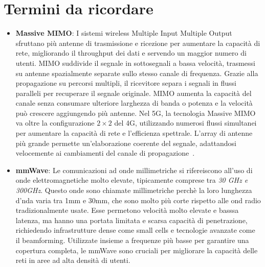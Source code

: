 \documentclass[english]{article}
\begin{document}
\section{Termini da ricordare}
\begin{itemize}
	\item \textbf{\hypertarget{MIMO}{Massive MIMO}}: I sistemi wireless Multiple Input Multiple Output
	      sfruttano più antenne di trasmissione e ricezione per aumentare la capacità di rete,
	      migliorando il throughput dei dati e servendo un maggior numero di utenti. MIMO suddivide
	      il segnale in sottosegnali a bassa velocità, trasmessi su antenne spazialmente separate
	      sullo stesso canale di frequenza. Grazie alla propagazione su percorsi multipli, il
	      ricevitore separa i segnali in flussi paralleli per recuperare il segnale originale.
	      MIMO aumenta la capacità del canale senza consumare ulteriore larghezza di banda o
	      potenza e la velocità può crescere aggiungendo più antenne. Nel 5G, la tecnologia
	      Massive MIMO va oltre la configurazione $2 \times 2$ del 4G, utilizzando numerosi
	      flussi simultanei per aumentare la capacità di rete e l'efficienza spettrale.
	      L'array di antenne più grande permette un'elaborazione coerente del segnale, adattandosi
	      velocemente ai cambiamenti del canale di propagazione~\cite{Kathavate2021Critical}.

	\item \textbf{\hypertarget{mmWave}{mmWave}}: Le comunicazioni ad onde millimetriche
	      si rifereiscono all'uso di onde elettromagnetiche molto elevate, tipicamente comprese
	      tra \textit{30 GHz e 300GHz}. Questo onde sono chiamate millimetriche perchè la loro
	      lunghezza d'nda varia tra 1mm e 30mm, che sono molto più corte rispetto alle ond radio
	      tradizionalmente usate. Esse permetono velocità molto elevate e basssa latenza, ma hanno
	      una portata limitata e scarsa capacità di penetrazione, richiedendo infrastrutture dense
	      come small cells e tecnologie avanzate come il beamforming. Utilizzate insieme
	      a frequenze più basse per garantire una copertura completa,
	      le mmWave sono cruciali per migliorare la capacità delle
	      reti in aree ad alta densità di utenti.


\end{itemize}
\end{document}
